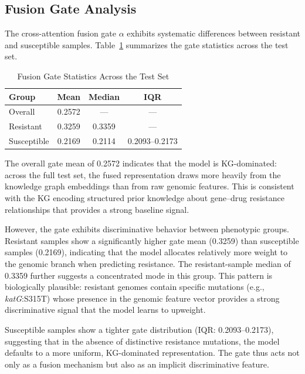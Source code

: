 \documentclass[conference]{IEEEtran}
\begin{document}
\subsection{Fusion Gate Analysis}

The cross-attention fusion gate $\alpha$ exhibits systematic differences between resistant and susceptible samples. Table~\ref{tab:gate} summarizes the gate statistics across the test set.

\begin{table}[t]
\centering
\caption{Fusion Gate Statistics Across the Test Set}
\label{tab:gate}
\begin{tabular}{lccc}
\toprule
\textbf{Group} & \textbf{Mean} & \textbf{Median} & \textbf{IQR} \\
\midrule
Overall       & 0.2572 & ---    & ---             \\
Resistant     & 0.3259 & 0.3359 & ---             \\
Susceptible   & 0.2169 & 0.2114 & 0.2093--0.2173  \\
\bottomrule
\end{tabular}
\end{table}

The overall gate mean of 0.2572 indicates that the model is KG-dominated: across the full test set, the fused representation draws more heavily from the knowledge graph embeddings than from raw genomic features. This is consistent with the KG encoding structured prior knowledge about gene--drug resistance relationships that provides a strong baseline signal.

However, the gate exhibits discriminative behavior between phenotypic groups. Resistant samples show a significantly higher gate mean (0.3259) than susceptible samples (0.2169), indicating that the model allocates relatively more weight to the genomic branch when predicting resistance. The resistant-sample median of 0.3359 further suggests a concentrated mode in this group. This pattern is biologically plausible: resistant genomes contain specific mutations (e.g., \textit{katG}:S315T) whose presence in the genomic feature vector provides a strong discriminative signal that the model learns to upweight.

Susceptible samples show a tighter gate distribution (IQR: 0.2093--0.2173), suggesting that in the absence of distinctive resistance mutations, the model defaults to a more uniform, KG-dominated representation. The gate thus acts not only as a fusion mechanism but also as an implicit discriminative feature.
\end{document}
